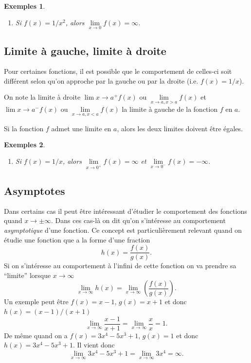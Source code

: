 \documentclass[a4paper,12pt]{book}
\newtheorem*{exemples}{Exemples}
\begin{document}
\begin{exemples}
\begin{enumerate}
\item Si $f(x)=1/x^2$, alors $\lim\limits_{x\rightarrow 0}f(x)=\infty$.
\end{enumerate}
\end{exemples}

\subsection{Limite à gauche, limite à droite}
Pour certaines fonctions, il est possible que le comportement
de celles-ci soit différent selon qu'on approche 
par la gauche ou par la droite (i.e. $f(x)=1/x$). 

On note la limite à droite $\lim\limits{x\rightarrow a^+} f(x)$ ou
$\lim\limits_{x\rightarrow a,x>a} f(x)$ et $\lim\limits{x\rightarrow a^-} f(x)$ ou
$\lim\limits_{x\rightarrow a,x<a} f(x)$ la limite à gauche de la fonction $f$ en $a$.

Si la fonction $f$ admet une limite en $a$, alors les deux limites doivent être égales.

\begin{exemples}
\begin{enumerate}
\item Si $f(x)=1/x$, alors $\lim\limits_{x\rightarrow 0^+} f(x)=\infty$ et $\lim\limits_{x\rightarrow 0^-} f(x)=-\infty$.
\end{enumerate}
\end{exemples}

\subsection{Asymptotes}

Dans certains cas il peut être intéressant d'étudier le comportement des fonctions quand $x\rightarrow\pm\infty$. 
Dans ces cas-là on dit qu'on s'intéresse au comportement \textit{asymptotique} d'une fonction. Ce concept est particulièrement
relevant quand on étudie une fonction que a la forme d'une fraction
\begin{equation}
 h(x)=\frac{f(x)}{g(x)}.
\end{equation}
Si on s'intéresse au comportement à l'infini de cette fonction on va prendre sa ``limite'' lorsque $x\rightarrow\infty$
\begin{equation}
 \lim_{x\rightarrow\infty} h(x)=\lim_{x\rightarrow\infty}\left(\frac{f(x)}{g(x)}\right).
\end{equation}
Un exemple peut être $f(x)=x-1$, $g(x)=x+1$ et donc $h(x)=(x-1)/(x+1)$
\begin{equation}
 \lim_{x\rightarrow\infty} \frac{x-1}{x+1}=\lim_{x\rightarrow\infty} \frac{x}{x}=1.
\end{equation}
De même quand on a $f(x)=3x^4-5x^3+1$, $g(x)=1$ et donc $h(x)=3x^4-5x^3+1$. Il vient donc
\begin{equation}
 \lim_{x\rightarrow\infty} 3x^4-5x^3+1=\lim_{x\rightarrow\infty}3x^4=\infty.
\end{equation}
\end{document}
